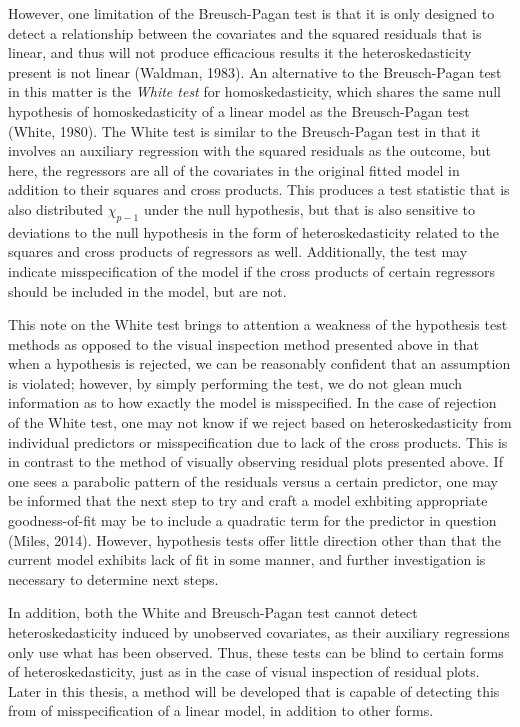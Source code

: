 		However, one limitation of the Breusch-Pagan test is that it is only designed to detect a relationship between the covariates and the squared residuals that is linear, and thus will not
		produce efficacious results it the heteroskedasticity present is not linear (Waldman, 1983). An alternative to the Breusch-Pagan test in this matter is the \textit{White test} for homoskedasticity,
		which shares the same null hypothesis of homoskedasticity of a linear model as the Breusch-Pagan test (White, 1980). The White test is similar to the Breusch-Pagan test in that it involves
		an auxiliary regression with the squared residuals as the outcome, but here, the regressors are all of the covariates in the original fitted model in addition to their squares and cross
		products. This produces a test statistic that is also distributed $\chi_{p-1}$ under the null hypothesis, but that is also sensitive to deviations to the null hypothesis in the form of
		heteroskedasticity related to the squares and cross products of regressors as well. Additionally, the test may indicate misspecification of the model if the cross products of certain
		regressors should be included in the model, but are not.

		This note on the White test brings to attention a weakness of the hypothesis test methods as opposed to the visual inspection method presented above in that when a hypothesis is rejected,
		we can be reasonably confident that an assumption is violated; however, by simply performing the test, we do not glean much information as to how exactly the model is misspecified. In the
		case of rejection of the White test, one may not know if we reject based on heteroskedasticity from individual predictors or misspecification due to lack of the cross products. This is in 
		contrast to the method of visually observing residual plots presented above. If one sees a parabolic pattern of the residuals versus a certain predictor, one may be informed that the next 
		step to try and craft a model exhbiting appropriate goodness-of-fit may be to include a quadratic term for the predictor in question (Miles, 2014). However, hypothesis tests offer little
		direction other than that the current model exhibits lack of fit in some manner, and further investigation is necessary to determine next steps.

		In addition, both the White and Breusch-Pagan test cannot detect heteroskedasticity induced by unobserved covariates, as their auxiliary regressions only use what has been observed.
		Thus, these tests can be blind to certain forms of heteroskedasticity, just as in the case of visual inspection of residual plots. Later in this thesis, a method will be developed
		that is capable of detecting this from of misspecification of a linear model, in addition to other forms.

